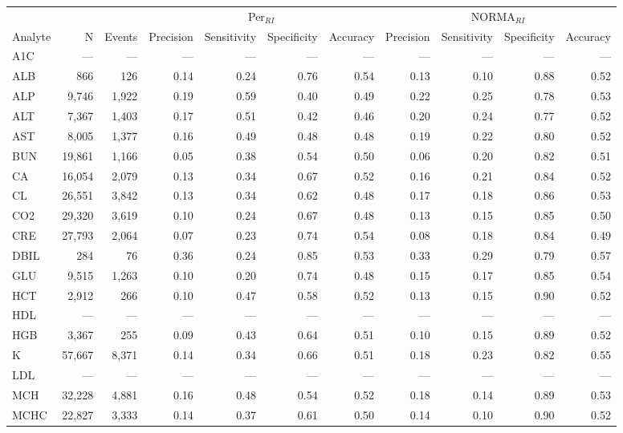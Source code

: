 \begin{table}[ht]
\centering
\footnotesize
\begin{tabular}{lrrrrrrrrrr}
\toprule
 & &  & \multicolumn{4}{c}{Per$_{RI}$} & \multicolumn{4}{c}{NORMA$_{RI}$} \\
\cmidrule(lr){4-7} \cmidrule(lr){8-11}
Analyte & N & Events & Precision & Sensitivity & Specificity & Accuracy & Precision & Sensitivity & Specificity & Accuracy \\
\midrule
A1C & --- & --- & --- & --- & --- & --- & --- & --- & --- & --- \\
ALB & 866 & 126 & 0.14 & 0.24 & 0.76 & 0.54 & 0.13 & 0.10 & 0.88 & 0.52 \\
ALP & 9,746 & 1,922 & 0.19 & 0.59 & 0.40 & 0.49 & 0.22 & 0.25 & 0.78 & 0.53 \\
ALT & 7,367 & 1,403 & 0.17 & 0.51 & 0.42 & 0.46 & 0.20 & 0.24 & 0.77 & 0.52 \\
AST & 8,005 & 1,377 & 0.16 & 0.49 & 0.48 & 0.48 & 0.19 & 0.22 & 0.80 & 0.52 \\
BUN & 19,861 & 1,166 & 0.05 & 0.38 & 0.54 & 0.50 & 0.06 & 0.20 & 0.82 & 0.51 \\
CA & 16,054 & 2,079 & 0.13 & 0.34 & 0.67 & 0.52 & 0.16 & 0.21 & 0.84 & 0.52 \\
CL & 26,551 & 3,842 & 0.13 & 0.34 & 0.62 & 0.48 & 0.17 & 0.18 & 0.86 & 0.53 \\
CO2 & 29,320 & 3,619 & 0.10 & 0.24 & 0.67 & 0.48 & 0.13 & 0.15 & 0.85 & 0.50 \\
CRE & 27,793 & 2,064 & 0.07 & 0.23 & 0.74 & 0.54 & 0.08 & 0.18 & 0.84 & 0.49 \\
DBIL & 284 & 76 & 0.36 & 0.24 & 0.85 & 0.53 & 0.33 & 0.29 & 0.79 & 0.57 \\
GLU & 9,515 & 1,263 & 0.10 & 0.20 & 0.74 & 0.48 & 0.15 & 0.17 & 0.85 & 0.54 \\
HCT & 2,912 & 266 & 0.10 & 0.47 & 0.58 & 0.52 & 0.13 & 0.15 & 0.90 & 0.52 \\
HDL & --- & --- & --- & --- & --- & --- & --- & --- & --- & --- \\
HGB & 3,367 & 255 & 0.09 & 0.43 & 0.64 & 0.51 & 0.10 & 0.15 & 0.89 & 0.52 \\
K & 57,667 & 8,371 & 0.14 & 0.34 & 0.66 & 0.51 & 0.18 & 0.23 & 0.82 & 0.55 \\
LDL & --- & --- & --- & --- & --- & --- & --- & --- & --- & --- \\
MCH & 32,228 & 4,881 & 0.16 & 0.48 & 0.54 & 0.52 & 0.18 & 0.14 & 0.89 & 0.53 \\
MCHC & 22,827 & 3,333 & 0.14 & 0.37 & 0.61 & 0.50 & 0.14 & 0.10 & 0.90 & 0.52 \\

\end{tabular}
\end{table}
